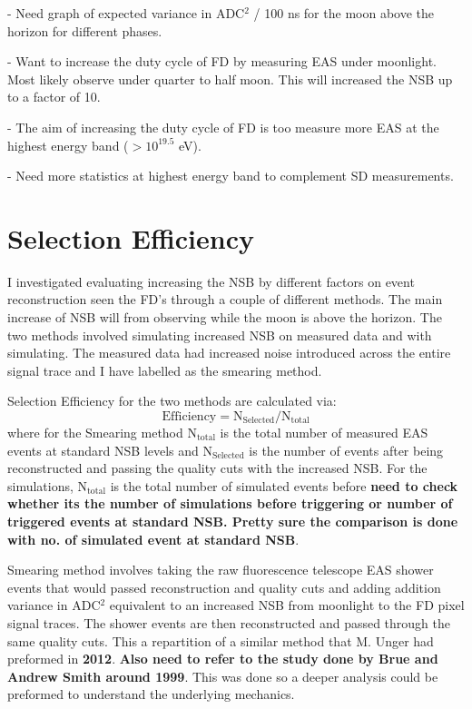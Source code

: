 - Need graph of expected variance in ADC$^2$ / 100 ns for the moon above the horizon for different phases.

- Want to increase the duty cycle of FD by measuring EAS under moonlight. Most likely observe under quarter to half moon. This will increased the NSB up to a factor of 10.

- The aim of increasing the duty cycle of FD is too measure more EAS at the highest energy band ($> 10^{19.5}$ eV).

- Need more statistics at highest energy band to complement SD measurements.


\section{Selection Efficiency}

I investigated evaluating increasing the NSB by different factors on event reconstruction seen the FD's through a couple of different methods. The main increase of NSB will from observing while the moon is above the horizon. The two methods involved simulating increased NSB on measured data and with simulating. The measured data had increased noise introduced across the entire signal trace and I have labelled as the smearing method.

Selection Efficiency for the two methods are calculated via:
\begin{equation}
\mathrm{Efficiency} = \mathrm{N}_{\mathrm{Selected}} / \mathrm{N}_{\mathrm{total}}
\end{equation}
where for the Smearing method N$_{\mathrm{total}}$ is the total number of measured EAS events at standard NSB levels and N$_{\mathrm{Selected}}$ is the number of events after being reconstructed and passing the quality cuts with the increased NSB. For the simulations, N$_{\mathrm{total}}$ is the total number of simulated events before \textbf{need to check whether its the number of simulations before triggering or number of triggered events at standard NSB. Pretty sure the comparison is done with no. of simulated event at standard NSB}.

Smearing method involves taking the raw fluorescence telescope EAS shower events that would passed reconstruction and quality cuts and adding addition variance in ADC$^2$ equivalent to an increased NSB from moonlight to the FD pixel signal traces. The shower events are then reconstructed and passed through the same quality cuts. This a repartition of a similar method that M. Unger had preformed in \textbf{2012}. \textbf{Also need to refer to the study done by Brue and Andrew Smith around 1999}. This was done so a deeper analysis could be preformed to understand the underlying mechanics. 

